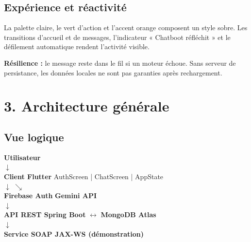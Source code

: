 \documentclass[10pt,a4paper]{article}
\newcommand{\callout}[1]{%
  \par\smallskip\noindent
  \colorbox{paper}{\parbox{\dimexpr\linewidth-2\fboxsep\relax}{#1}}%
  \par\smallskip
}
\begin{document}
\subsection*{Expérience et réactivité}
La palette claire, le vert d'action et l'accent orange composent un style sobre. Les transitions d'accueil et de messages, l'indicateur « Chatboot réfléchit » et le défilement automatique rendent l'activité visible.

\callout{\textbf{Résilience :} le message reste dans le fil si un moteur échoue. Sans serveur de persistance, les données locales ne sont pas garanties après rechargement.}

\newpage
\normalsize
\section*{3. Architecture générale}

\subsection*{Vue logique}
\begin{center}
\colorbox{paper}{\parbox{0.93\textwidth}{\centering
\vspace{0.35cm}
\textbf{Utilisateur}\\[0.15cm]
$\downarrow$\\[0.15cm]
\textbf{Client Flutter} \quad AuthScreen \;|\; ChatScreen \;|\; AppState\\[0.15cm]
$\downarrow$ \hspace{1cm} $\searrow$\\[0.15cm]
\textbf{Firebase Auth} \hspace{1.4cm} \textbf{Gemini API}\\[0.15cm]
$\downarrow$\\[0.15cm]
\textbf{API REST Spring Boot} $\longleftrightarrow$ \textbf{MongoDB Atlas}\\[0.15cm]
$\downarrow$\\[0.15cm]
\textbf{Service SOAP JAX-WS (démonstration)}
\vspace{0.35cm}}}
\end{center}
\end{document}
